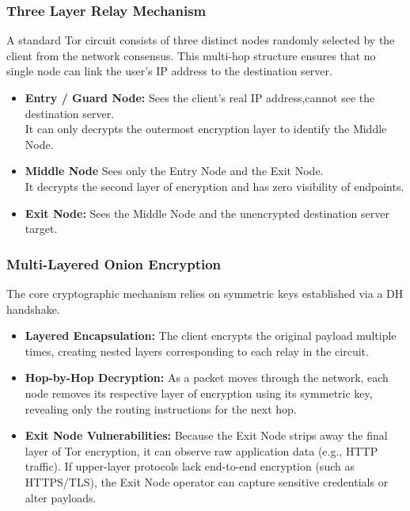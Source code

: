 \subsubsection*{Three Layer Relay Mechanism}
A standard Tor circuit consists of three distinct nodes randomly selected by the client from the network consensus. This multi-hop structure ensures that no single node can link the user's IP address to the destination server.

\begin{itemize}
    \item \textbf{Entry / Guard Node:} Sees the client's real IP address,cannot see the destination server.\\
    It can only decrypts the outermost encryption layer to identify the Middle Node.

    \item \textbf{Middle Node} Sees only the Entry Node and the Exit Node.\\
    It decrypts the second layer of encryption and has zero visibility of endpoints.

    \item \textbf{Exit Node:} Sees the Middle Node and the unencrypted destination server target. 
\end{itemize}



\subsubsection*{Multi-Layered Onion Encryption}
The core cryptographic mechanism relies on symmetric keys established via a DH handshake.
\begin{itemize}
    \item \textbf{Layered Encapsulation:} The client encrypts the original payload multiple times, creating nested layers corresponding to each relay in the circuit.
    \item \textbf{Hop-by-Hop Decryption:} As a packet moves through the network, each node removes its respective layer of encryption using its symmetric key, revealing only the routing instructions for the next hop.
    \item \textbf{Exit Node Vulnerabilities:} Because the Exit Node strips away the final layer of Tor encryption, it can observe raw application data (e.g., HTTP traffic). If upper-layer protocols lack end-to-end encryption (such as HTTPS/TLS), the Exit Node operator can capture sensitive credentials or alter payloads.
\end{itemize}

